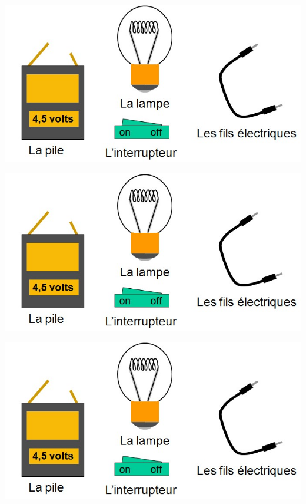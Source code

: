 \documentclass[12pt,a4paper]{article}
\date{}
\title{}
\begin{document}
	
\begin{multicols}{2}
	\begin{center}
	\includegraphics[scale=0.45]{img/dipoles}
\end{center}

\begin{center}
	\includegraphics[scale=0.45]{img/dipoles}
\end{center}

\begin{center}
	\includegraphics[scale=0.45]{img/dipoles}
\end{center}


\end{multicols}
\end{document}
